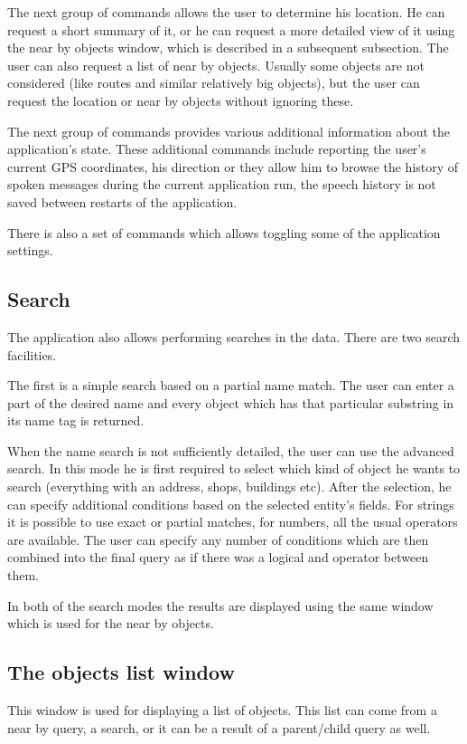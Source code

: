 \documentclass[nolof,digital]{fithesis3}
\begin{document}
The next group of commands allows the user to determine his location. He can request a short summary of it, or he can request a more detailed view of it using the near by objects window, which is described in a subsequent subsection. The user can also request a list of near by objects. Usually some objects are not considered (like routes and similar relatively big objects), but the user can request the location or near by objects without ignoring these.

The next group of commands provides various additional information about the application's state. These additional commands include reporting the user's current GPS coordinates, his direction or they allow him to browse the history of spoken messages during the current application run, the speech history is not saved between restarts of the application.

There is also a set of commands which allows toggling some of the application settings.
\subsection{Search}
The application also allows performing searches in the data. There are two search facilities.

The first is a simple search based on a partial name match. The user can enter a part of the desired name and every object which has that particular substring in its name tag is returned.

When the name search is not sufficiently detailed, the user can use the advanced search. In this mode he is first required to select which kind of object he wants to search (everything with an address, shops, buildings etc). After the selection, he can specify additional conditions based on the selected entity's fields. For strings it is possible to use exact or partial matches, for numbers, all the usual operators are available. The user can specify any number of conditions which are then combined into the final query as if there was a logical and operator between them.

In both of the search modes the results are displayed using the same window which is used for the near by objects.
\subsection{The objects list window}
This window is used for displaying a list of objects. This list can come from a near by query, a search, or it can be a result of a parent/child query as well.
\end{document}
